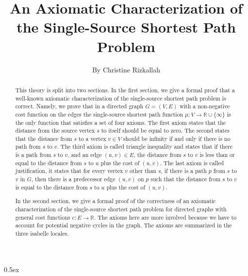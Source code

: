 \documentclass[11pt,a4paper]{article}
\newcommand{\real}{\mathbb{R}}
\begin{document}
\title{An Axiomatic Characterization of the Single-Source Shortest Path Problem}
\author{By Christine Rizkallah}
\maketitle

\begin{abstract}
 This theory is split into two sections. In the first section, we give a formal proof that a well-known axiomatic characterization of the single-source shortest path problem is correct. Namely, we prove that in a directed graph $G=(V,E)$ with a non-negative cost function on the edges the single-source shortest path function $\mu:V\to\real\cup\{\infty\}$ is the only function that satisfies a set of four axioms. The first axiom states that the distance from the source vertex $s$ to itself should be equal to zero. The second states that the distance from $s$ to a vertex $v\in V$ should be infinity if and only if there is no path from $s$ to $v$. The third axiom is called triangle inequality and states that if there is a path from $s$ to $v$, and an edge $(u,v)\in E$, the distance from $s$ to $v$ is less than or equal to the distance from $s$ to $u$ plus the cost of $(u,v)$. The last axiom is called justification, it states that for every vertex $v$ other than $s$, if there is a path $p$ from $s$ to $v$ in $G$, then there is a predecessor edge $(u,v)$ on $p$ such that the distance from $s$ to $v$ is equal to the distance from $s$ to $u$ plus the cost of $(u,v)$. 

In the second section, we give a formal proof of the correctness of an axiomatic characterization of the single-source shortest path problem for directed graphs with general cost functions $c:E\to\real$. The axioms here are more involved because we have to account for potential negative cycles in the graph. The axioms are summarized in the three isabelle locales. 
\end{abstract}

\tableofcontents

\parindent 0pt\parskip 0.5ex



%
%


\end{document}
